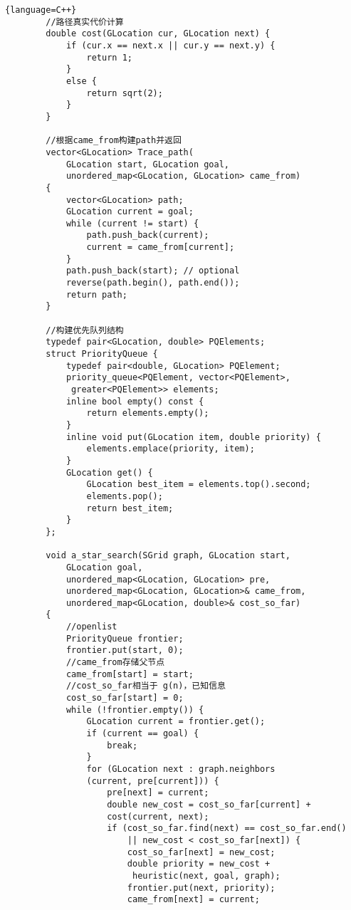 \documentclass[withoutpreface,bwprint]{cumcmthesis} %
\begin{document}
\begin{appendix}
\begin{lstlisting}{language=C++}
        //路径真实代价计算
        double cost(GLocation cur, GLocation next) {
            if (cur.x == next.x || cur.y == next.y) {
                return 1;
            }
            else {
                return sqrt(2);
            }
        }
        
        //根据came_from构建path并返回
        vector<GLocation> Trace_path(
            GLocation start, GLocation goal,
            unordered_map<GLocation, GLocation> came_from)
        {
            vector<GLocation> path;
            GLocation current = goal;
            while (current != start) {
                path.push_back(current);
                current = came_from[current];
            }
            path.push_back(start); // optional
            reverse(path.begin(), path.end());
            return path;
        }
        
        //构建优先队列结构
        typedef pair<GLocation, double> PQElements;
        struct PriorityQueue {
            typedef pair<double, GLocation> PQElement;
            priority_queue<PQElement, vector<PQElement>,
             greater<PQElement>> elements;
            inline bool empty() const {
                return elements.empty();
            }
            inline void put(GLocation item, double priority) {
                elements.emplace(priority, item);
            }
            GLocation get() {
                GLocation best_item = elements.top().second;
                elements.pop();
                return best_item;
            }
        };
        
        void a_star_search(SGrid graph, GLocation start,
            GLocation goal, 
            unordered_map<GLocation, GLocation> pre,
            unordered_map<GLocation, GLocation>& came_from,
            unordered_map<GLocation, double>& cost_so_far)
        {
            //openlist
            PriorityQueue frontier;
            frontier.put(start, 0);
            //came_from存储父节点
            came_from[start] = start;
            //cost_so_far相当于 g(n)，已知信息
            cost_so_far[start] = 0;
            while (!frontier.empty()) {
                GLocation current = frontier.get();
                if (current == goal) {
                    break;
                }
                for (GLocation next : graph.neighbors
                (current, pre[current])) {
                    pre[next] = current;
                    double new_cost = cost_so_far[current] + 
                    cost(current, next);
                    if (cost_so_far.find(next) == cost_so_far.end()
                        || new_cost < cost_so_far[next]) {
                        cost_so_far[next] = new_cost;
                        double priority = new_cost +
                         heuristic(next, goal, graph);
                        frontier.put(next, priority);
                        came_from[next] = current;
                        

\end{lstlisting}
\end{appendix}
\end{document}
